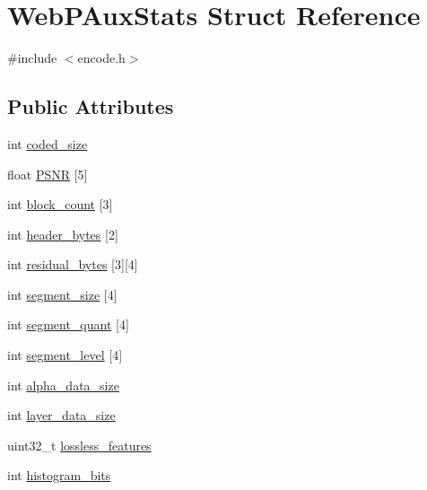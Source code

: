 \hypertarget{struct_web_p_aux_stats}{}\section{Web\+P\+Aux\+Stats Struct Reference}
\label{struct_web_p_aux_stats}


{\ttfamily \#include $<$encode.\+h$>$}

\subsection*{Public Attributes}
\begin{DoxyCompactItemize}
\item 
int \mbox{\hyperlink{struct_web_p_aux_stats_a845f6cb8e702c6542c5641defd1bb06b}{coded\+\_\+size}}
\item 
float \mbox{\hyperlink{struct_web_p_aux_stats_aad742a74c5e608b96b58f4d3528fc4ce}{P\+S\+NR}} \mbox{[}5\mbox{]}
\item 
int \mbox{\hyperlink{struct_web_p_aux_stats_a6eb29c280d65aaeaba47ee3c1f7cda46}{block\+\_\+count}} \mbox{[}3\mbox{]}
\item 
int \mbox{\hyperlink{struct_web_p_aux_stats_a995ac1cba384ab0700df9f4205b55c0f}{header\+\_\+bytes}} \mbox{[}2\mbox{]}
\item 
int \mbox{\hyperlink{struct_web_p_aux_stats_a17641f1067dad52b0e765b0219ce1631}{residual\+\_\+bytes}} \mbox{[}3\mbox{]}\mbox{[}4\mbox{]}
\item 
int \mbox{\hyperlink{struct_web_p_aux_stats_a2f5638ce6b240cf1e00f886e0dc3ba4d}{segment\+\_\+size}} \mbox{[}4\mbox{]}
\item 
int \mbox{\hyperlink{struct_web_p_aux_stats_a7cdba472683cbb9ad6971dac65081a06}{segment\+\_\+quant}} \mbox{[}4\mbox{]}
\item 
int \mbox{\hyperlink{struct_web_p_aux_stats_a1f8d0d9e6df0854ad5d74bdb5d396007}{segment\+\_\+level}} \mbox{[}4\mbox{]}
\item 
int \mbox{\hyperlink{struct_web_p_aux_stats_afeeb0a0edcf5283ff687e00947e31f5b}{alpha\+\_\+data\+\_\+size}}
\item 
int \mbox{\hyperlink{struct_web_p_aux_stats_a59d8f8889a7f2d68fd02d356f113033d}{layer\+\_\+data\+\_\+size}}
\item 
uint32\+\_\+t \mbox{\hyperlink{struct_web_p_aux_stats_af2ac670c77bae37d4add84b8d7de3dd5}{lossless\+\_\+features}}
\item 
int \mbox{\hyperlink{struct_web_p_aux_stats_a3ae90c934aaaf5c229811598f60f032a}{histogram\+\_\+bits}}

\end{DoxyCompactItemize}
